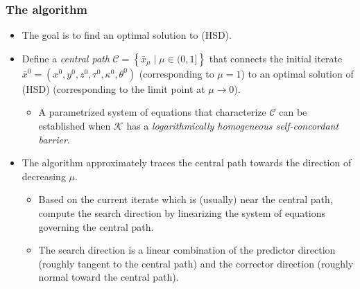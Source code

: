 \documentclass{beamer}
\begin{document}
\begin{frame}
	\frametitle{The algorithm}
	\begin{itemize}
		\item The goal is to find an optimal solution to (HSD).
		\item Define a \textit{central path} $\mathcal{C} = \left\{\bar x_\mu \mid \mu \in (0,1] \right\}$ that connects the initial iterate $\bar x^0 = \left(x^0,y^0,z^0,\tau^0,\kappa^0,\theta^0\right)$ (corresponding to $\mu=1$) to an optimal solution of (HSD) (corresponding to the limit point at $\mu \rightarrow 0$).
		\begin{itemize}
		\item A parametrized system of equations that characterize $\mathcal{C}$ can be established when $\mathcal{K}$ has a \textit{logarithmically homogeneous self-concordant barrier}.
		\end{itemize}
		\item The algorithm approximately traces the central path towards the direction of decreasing $\mu$.
				\begin{itemize}
					\item Based on the current iterate which is (usually) near the central path, compute the search direction by linearizing the system of equations governing the central path.
					\item The search direction is a linear combination of the predictor direction (roughly tangent to the central path) and the corrector direction (roughly normal toward the central path).
				\end{itemize}
	\end{itemize}
\end{frame}
\end{document}
